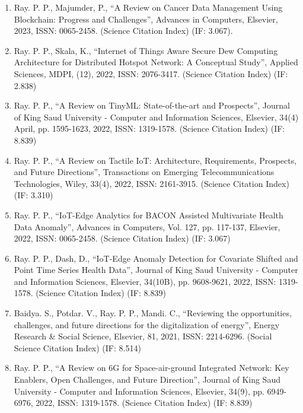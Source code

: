 \documentclass[11pt,a4paper]{moderncv}
\begin{document}
\begin{adjustwidth}{6em}{0pt}
\begin{enumerate}
		\item Ray. P. P., Majumder, P., “A Review on Cancer Data Management Using Blockchain: Progress and Challenges”, Advances in Computers, Elsevier, 2023, ISSN: 0065-2458. (Science Citation Index) (IF: 3.067).
		\item Ray. P. P., Skala, K., “Internet of Things Aware Secure Dew Computing Architecture for Distributed Hotspot Network: A Conceptual Study”, Applied Sciences, MDPI, (12), 2022, ISSN: 2076-3417. (Science Citation Index) (IF: 2.838)
		\item Ray. P. P., “A Review on TinyML: State-of-the-art and Prospects”, Journal of King Saud University - Computer and Information Sciences, Elsevier, 34(4) April, pp. 1595-1623, 2022, ISSN: 1319-1578. (Science Citation Index) (IF: 8.839)
		\item Ray. P. P., “A Review on Tactile IoT: Architecture, Requirements, Prospects, and Future Directions”, Transactions on Emerging Telecommunications Technologies, Wiley, 33(4), 2022, ISSN: 2161-3915. (Science Citation Index) (IF: 3.310)
		\item Ray. P. P., “IoT-Edge Analytics for BACON Assisted Multivariate Health Data Anomaly”, Advances in Computers, Vol. 127, pp. 117-137, Elsevier, 2022, ISSN: 0065-2458. (Science Citation Index) (IF: 3.067)
		\item Ray. P. P., Dash, D., “IoT-Edge Anomaly Detection for Covariate Shifted and Point Time Series Health Data”, Journal of King Saud University - Computer and Information Sciences, Elsevier, 34(10B), pp. 9608-9621, 2022, ISSN: 1319-1578. (Science Citation Index) (IF: 8.839)
		\item Baidya. S., Potdar. V., Ray. P. P., Mandi. C., “Reviewing the opportunities, challenges, and future directions for the digitalization of energy”, Energy Research \& Social Science, Elsevier, 81, 2021, ISSN: 2214-6296. (Social Science Citation Index) (IF: 8.514)
		\item Ray. P. P., “A Review on 6G for Space-air-ground Integrated Network: Key Enablers, Open Challenges, and Future Direction”, Journal of King Saud University - Computer and Information Sciences, Elsevier, 34(9), pp. 6949-6976, 2022, ISSN: 1319-1578. (Science Citation Index) (IF: 8.839)
		

\end{enumerate}
\end{adjustwidth}
\end{document}
